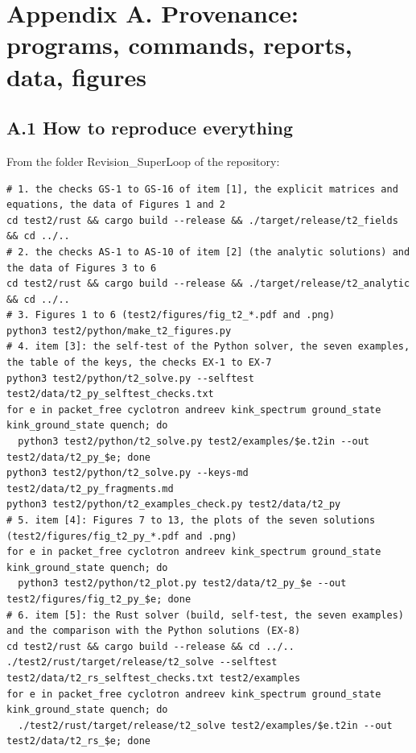 \documentclass[
  10pt,
]{article}
\begin{document}
\hypertarget{appendix-a.-provenance-programs-commands-reports-data-figures}{%
\section{Appendix A. Provenance: programs, commands, reports, data,
figures}\label{appendix-a.-provenance-programs-commands-reports-data-figures}}

\hypertarget{a.1-how-to-reproduce-everything}{%
\subsection{A.1 How to reproduce
everything}\label{a.1-how-to-reproduce-everything}}

From the folder Revision\_SuperLoop of the repository:

\begin{verbatim}
# 1. the checks GS-1 to GS-16 of item [1], the explicit matrices and equations, the data of Figures 1 and 2
cd test2/rust && cargo build --release && ./target/release/t2_fields && cd ../..
# 2. the checks AS-1 to AS-10 of item [2] (the analytic solutions) and the data of Figures 3 to 6
cd test2/rust && cargo build --release && ./target/release/t2_analytic && cd ../..
# 3. Figures 1 to 6 (test2/figures/fig_t2_*.pdf and .png)
python3 test2/python/make_t2_figures.py
# 4. item [3]: the self-test of the Python solver, the seven examples, the table of the keys, the checks EX-1 to EX-7
python3 test2/python/t2_solve.py --selftest test2/data/t2_py_selftest_checks.txt
for e in packet_free cyclotron andreev kink_spectrum ground_state kink_ground_state quench; do
  python3 test2/python/t2_solve.py test2/examples/$e.t2in --out test2/data/t2_py_$e; done
python3 test2/python/t2_solve.py --keys-md test2/data/t2_py_fragments.md
python3 test2/python/t2_examples_check.py test2/data/t2_py
# 5. item [4]: Figures 7 to 13, the plots of the seven solutions (test2/figures/fig_t2_py_*.pdf and .png)
for e in packet_free cyclotron andreev kink_spectrum ground_state kink_ground_state quench; do
  python3 test2/python/t2_plot.py test2/data/t2_py_$e --out test2/figures/fig_t2_py_$e; done
# 6. item [5]: the Rust solver (build, self-test, the seven examples) and the comparison with the Python solutions (EX-8)
cd test2/rust && cargo build --release && cd ../..
./test2/rust/target/release/t2_solve --selftest test2/data/t2_rs_selftest_checks.txt test2/examples
for e in packet_free cyclotron andreev kink_spectrum ground_state kink_ground_state quench; do
  ./test2/rust/target/release/t2_solve test2/examples/$e.t2in --out test2/data/t2_rs_$e; done

\end{verbatim}
\end{document}
